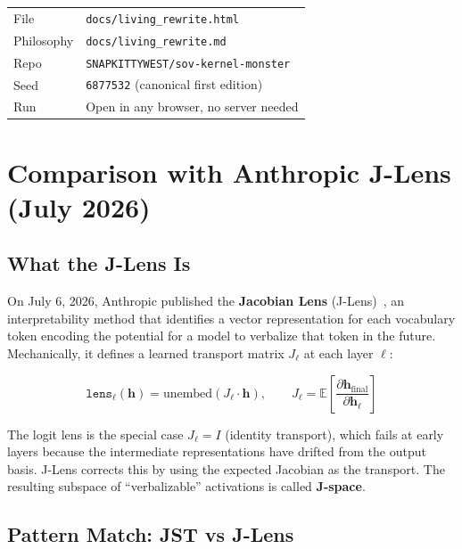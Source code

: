 \documentclass[12pt, letterpaper]{article}
\theoremstyle{plain}
\theoremstyle{definition}
\theoremstyle{remark}
\begin{document}
\begin{center}
\begin{tabular}{@{}ll@{}}
\toprule
File & \texttt{docs/living\_rewrite.html} \\
Philosophy & \texttt{docs/living\_rewrite.md} \\
Repo & \texttt{SNAPKITTYWEST/sov-kernel-monster} \\
Seed & \texttt{6877532} (canonical first edition) \\
Run & Open in any browser, no server needed \\
\bottomrule
\end{tabular}
\end{center}

\section{Comparison with Anthropic J-Lens (July 2026)}
\label{app:jlens}

\subsection{What the J-Lens Is}

On July 6, 2026, Anthropic published the \textbf{Jacobian Lens} (J-Lens)~\cite{jlens2026},
an interpretability method that identifies a vector representation for each
vocabulary token encoding the potential for a model to verbalize that token in
the future. Mechanically, it defines a learned transport matrix $J_\ell$ at each
layer $\ell$:

\begin{equation}
  \texttt{lens}_\ell(\mathbf{h}) = \text{unembed}(J_\ell \cdot \mathbf{h}),
  \qquad
  J_\ell = \mathbb{E}\!\left[\frac{\partial \mathbf{h}_\text{final}}{\partial \mathbf{h}_\ell}\right]
  \label{eq:jlens}
\end{equation}

The logit lens is the special case $J_\ell = I$ (identity transport), which fails
at early layers because the intermediate representations have drifted from the
output basis. J-Lens corrects this by using the expected Jacobian as the transport.
The resulting subspace of ``verbalizable'' activations is called \textbf{J-space}.

\subsection{Pattern Match: JST vs J-Lens}
\end{document}
